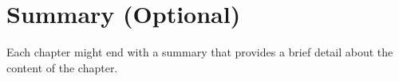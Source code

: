 \section{Summary (Optional)}
\begin{justify}
Each chapter might end with a summary that provides a brief detail about the content of the chapter.
\end{justify}

\clearpage